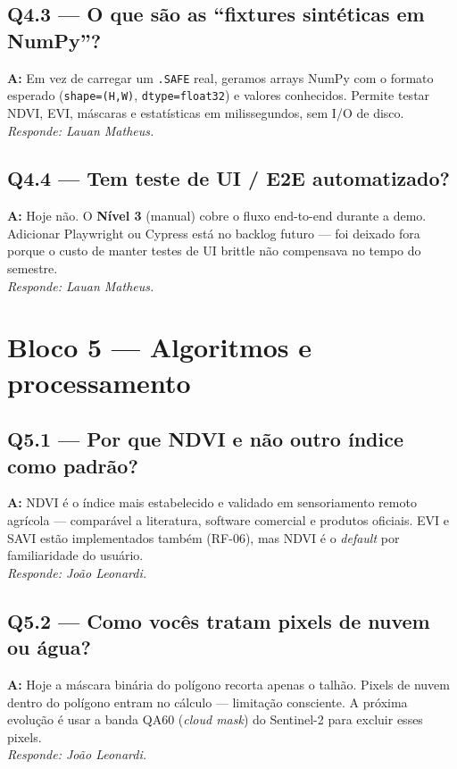 \documentclass[12pt,a4paper]{article}
\begin{document}
\subsection*{Q4.3 — O que são as \textquotedblleft fixtures sintéticas em NumPy\textquotedblright?}
\textbf{A:} Em vez de carregar um \texttt{.SAFE} real, geramos arrays NumPy
com o formato esperado (\texttt{shape=(H,W)}, \texttt{dtype=float32}) e
valores conhecidos. Permite testar NDVI, EVI, máscaras e estatísticas em
milissegundos, sem I/O de disco.
\\[2pt] \textit{Responde: Lauan Matheus.}

\subsection*{Q4.4 — Tem teste de UI / E2E automatizado?}
\textbf{A:} Hoje não. O \textbf{Nível 3} (manual) cobre o fluxo end-to-end
durante a demo. Adicionar Playwright ou Cypress está no backlog futuro — foi
deixado fora porque o custo de manter testes de UI brittle não compensava no
tempo do semestre.
\\[2pt] \textit{Responde: Lauan Matheus.}

\section*{Bloco 5 — Algoritmos e processamento}

\subsection*{Q5.1 — Por que NDVI e não outro índice como padrão?}
\textbf{A:} NDVI é o índice mais estabelecido e validado em sensoriamento
remoto agrícola — comparável a literatura, software comercial e produtos
oficiais. EVI e SAVI estão implementados também (RF-06), mas NDVI é o
\textit{default} por familiaridade do usuário.
\\[2pt] \textit{Responde: João Leonardi.}

\subsection*{Q5.2 — Como vocês tratam pixels de nuvem ou água?}
\textbf{A:} Hoje a máscara binária do polígono recorta apenas o talhão.
Pixels de nuvem dentro do polígono entram no cálculo — limitação consciente.
A próxima evolução é usar a banda QA60 (\textit{cloud mask}) do Sentinel-2
para excluir esses pixels.
\\[2pt] \textit{Responde: João Leonardi.}
\end{document}
